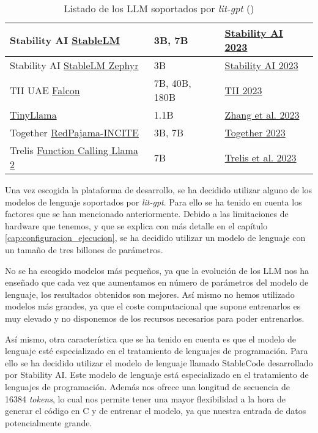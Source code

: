 \begin{table}[H]
{\begin{tabular}{|l|l|l|}
        \hline
        Stability AI \href{tutorials/download_stablelm.md}{StableLM} & 3B, 7B & \href{https://github.com/Stability-AI/StableLM}{Stability AI 2023} \\
        \hline
        Stability AI \href{tutorials/download_stablelm.md}{StableLM Zephyr} & 3B & \href{https://stability.ai/blog/stablecode-llm-generative-ai-coding}{Stability AI 2023} \\
        \hline
        TII UAE \href{tutorials/download_falcon.md}{Falcon} & 7B, 40B, 180B & \href{https://falconllm.tii.ae}{TII 2023} \\
        \hline
        \href{tutorials/download_tinyllama.md}{TinyLlama} & 1.1B & \href{https://github.com/jzhang38/TinyLlama}{Zhang et al. 2023} \\
        \hline
        Together \href{tutorials/download_redpajama_incite.md}{RedPajama-INCITE} & 3B, 7B & \href{https://together.ai/blog/redpajama-models-v1}{Together 2023} \\
        \hline
        Trelis \href{tutorials/download_function_calling_llama_2.md}{Function Calling Llama 2} & 7B & \href{https://huggingface.co/Trelis/Llama-2-7b-chat-hf-function-calling-v2}{Trelis et al. 2023} \\
        \hline
    \end{tabular}%
    }
    \caption[Listado de los LLM soportados por \textit{lit-gpt}]{Listado de los LLM soportados por \textit{lit-gpt} (\cite{litGPT})}
    \label{tab:litGPT}
\end{table}

Una vez escogida la plataforma de desarrollo, se ha decidido utilizar alguno de los
modelos de lenguaje soportados por \textit{lit-gpt}. Para ello se ha tenido en cuenta los
factores que se han mencionado anteriormente. Debido a las limitaciones de hardware
que tenemos, y que se explica con más detalle en el capítulo \ref{cap:configuracion_ejecucion},
se ha decidido utilizar un modelo de lenguaje con un tamaño de tres billones de parámetros.

No se ha escogido modelos más pequeños, ya que la evolución de los LLM nos ha enseñado
que cada vez que aumentamos en número de parámetros del modelo de lenguaje, los resultados
obtenidos son mejores. Así mismo no hemos utilizado modelos más grandes, ya que el coste
computacional que supone entrenarlos es muy elevado y no disponemos de los recursos
necesarios para poder entrenarlos.

Así mismo, otra característica que se ha tenido en cuenta es que el modelo de lenguaje
esté especializado en el tratamiento de lenguajes de programación. Para ello se ha
decidido utilizar el modelo de lenguaje llamado StableCode\cite{StableCode} desarrollado
por Stability AI. Este modelo de lenguaje está especializado en el tratamiento de lenguajes
de programación. Además nos ofrece una longitud de secuencia de 16384 \textit{tokens}, lo cual
nos permite tener una mayor flexibilidad a la hora de generar el código en C y de entrenar
el modelo, ya que nuestra entrada de datos potencialmente grande.

